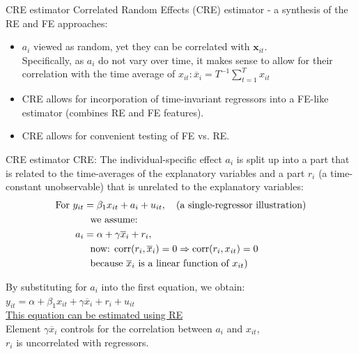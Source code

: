 \documentclass[usenames,dvipsnames]{beamer}
\begin{document}
\begin{frame}{CRE estimator}
Correlated Random Effects (CRE) estimator - a synthesis of the RE and FE approaches: 
\vspace{0.5cm}
\begin{itemize}
\item $a_i$ viewed as random, yet they can be correlated with $\bm{x}_{it}$.\\
\vspace{0.2cm}
Specifically, as $a_i$ do not vary over time, it makes sense to allow for their correlation with the time average of $x_{it}:\overline{x}_i = T^{-1} \sum^T_{t=1}x_{it}$
\vspace{0.2cm}
\item CRE allows for incorporation of time-invariant regressors into a FE-like estimator (combines RE and FE features).
\vspace{0.2cm}
\item CRE allows for convenient testing of FE vs. RE.
\end{itemize}
\end{frame}
\begin{frame}{CRE estimator}
CRE: The individual-specific effect $a_i$ is split up into a part that is related to the time-averages of the explanatory variables and a part $r_i$ (a time-constant unobservable) that is unrelated to the explanatory variables: 
\begin{align*}
\textnormal{For } y_{it} & =  \beta_1 x_{it} + a_i + u_{it},\quad \textnormal{(a single-regressor illustration)} \\
&\textnormal{~~we assume:}\\ 
a_i & = \alpha + \gamma \overline{x}_i + r_i, \\
&\textnormal{~~now: } \textnormal{corr}(r_i, \overline{x}_i) = 0 \Rightarrow \textnormal{corr}(r_i,x_{it}) = 0\\ 
&\textnormal{~~because $\overline{x}_i$  is a linear function of  $x_{it}$)}
\end{align*}

By substituting for $a_i$ into the first equation, we obtain: \\
$y_{it} = \alpha + \beta_1 x_{it} + \gamma \overline{x}_i + r_i + u_{it}$ \\
\bigskip
\underline{This equation can be estimated using RE}\\
Element $\gamma \overline{x}_i$ controls for the correlation between $a_i$ and $x_{it}$, \\$r_i$ is uncorrelated with regressors.
\end{frame}
\end{document}
